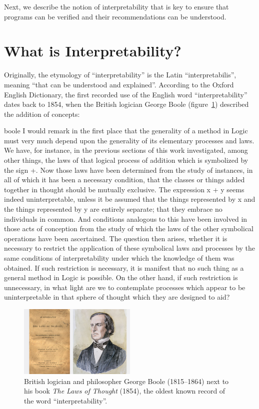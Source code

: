 Next, we describe the notion of interpretability that is key to ensure that programs can be verified and their recommendations can be understood.

\section{What is Interpretability?}


Originally, the etymology of ``interpretability'' is the Latin ``interpretabilis'', meaning ``that can be understood and explained''.
According to the Oxford English Dictionary, the first recorded use of the English word ``interpretability'' dates back to 1854, when the British logician George Boole (figure~\ref{fig:george-boole}) described the addition of concepts:

\begin{displaycquote}[p.~48]{boole}
I would remark in the first place that the generality of a method in Logic
must very much depend upon the generality of its elementary processes and laws.
We have, for instance, in the previous sections of this work investigated, among
other things, the laws of that logical process of addition which is symbolized by
the sign +. Now those laws have been determined from the study of instances,
in all of which it has been a necessary condition, that the classes or things added
together in thought should be mutually exclusive. The expression x + y seems
indeed uninterpretable, unless it be assumed that the things represented by x
and the things represented by y are entirely separate; that they embrace no
individuals in common. And conditions analogous to this have been involved
in those acts of conception from the study of which the laws of the other
symbolical operations have been ascertained. The question then arises, whether
it is necessary to restrict the application of these symbolical laws and processes
by the same conditions of interpretability under which the knowledge of them
was obtained. If such restriction is necessary, it is manifest that no such thing
as a general method in Logic is possible. On the other hand, if such restriction
is unnecessary, in what light are we to contemplate processes which appear to
be uninterpretable in that sphere of thought which they are designed to aid?
\end{displaycquote}\label{quote:boole}

\begin{figure}
    \centering
    \includegraphics[width=0.5\textwidth]{images/images_intro/gboole.jpg}
    \caption{British logician and philosopher George Boole (1815--1864) next to his book \textit{The Laws of Thought} (1854), the oldest known record of the word ``interpretability''.}
    \label{fig:george-boole}
\end{figure}

